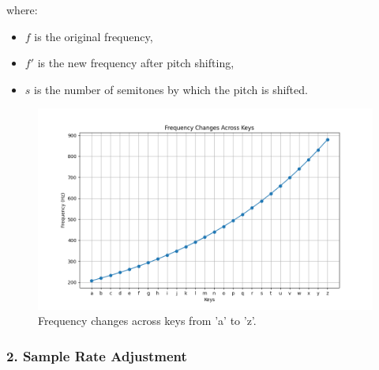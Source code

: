 where:
\begin{itemize}
  \item \( f \) is the original frequency,
  \item \( f' \) is the new frequency after pitch shifting,
  \item \( s \) is the number of semitones by which the pitch is shifted.
\end{itemize}
\begin{figure}[h!]
    \centering
    \includegraphics[width=0.8\linewidth]{Development/frequency_changes.png}
    \caption{Frequency changes across keys from 'a' to 'z'.}
    \label{fig:keyboard_sin}
\end{figure} \noindent
\subsubsection*{2. Sample Rate Adjustment}


